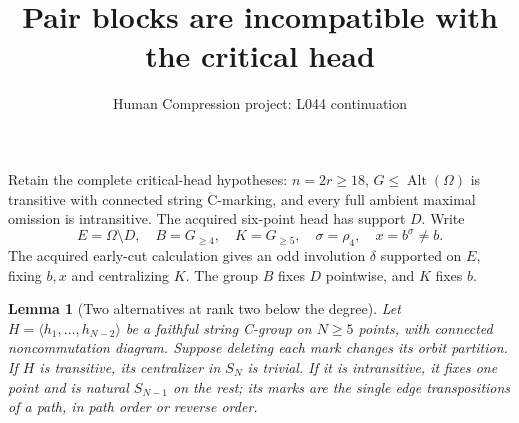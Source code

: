 \documentclass[11pt,a4paper]{article}
\title{Pair blocks are incompatible with the critical head}
\author{Human Compression project: L044 continuation}
\date{}
\newtheorem{lemma}{Lemma}
\newcommand{\gen}[1]{\langle#1\rangle}
\begin{document}
\maketitle
Retain the complete critical-head hypotheses: $n=2r\ge18$,
$G\le\operatorname{Alt}(\Omega)$ is transitive with connected
string C-marking, and every full ambient maximal omission is
intransitive. The acquired six-point head has support $D$.
Write
\[
 E=\Omega\setminus D,\quad B=G_{\ge4},\quad K=G_{\ge5},
 \quad\sigma=\rho_4,\quad x=b^\sigma\ne b.
\]
The acquired early-cut calculation gives an odd involution
$\delta$ supported on $E$, fixing $b,x$ and centralizing $K$.
The group $B$ fixes $D$ pointwise, and $K$ fixes $b$.

\begin{lemma}[Two alternatives at rank two below the degree]
\label{row}
Let $H=\gen{h_1,\ldots,h_{N-2}}$ be a faithful string
C-group on $N\ge5$ points, with connected noncommutation
diagram. Suppose deleting each mark changes its orbit partition.
If $H$ is transitive, its centralizer in $S_N$ is trivial.
If it is intransitive, it fixes one point and is natural
$S_{N-1}$ on the rest; its marks are the single edge
transpositions of a path, in path order or reverse order.
\end{lemma}
\end{document}
